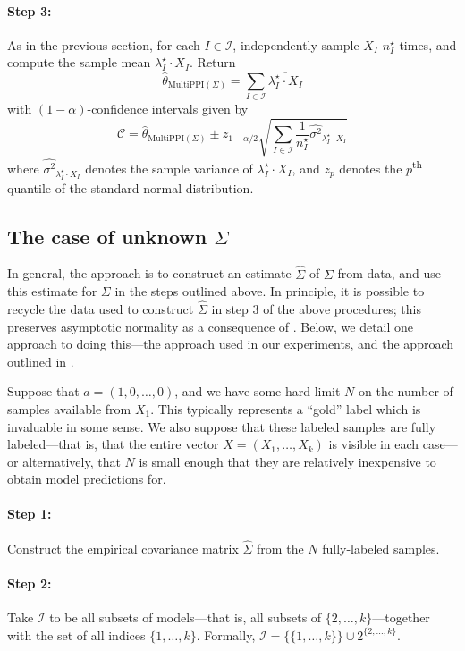 \documentclass{article} %
\newcommand{\wh}[1]{\widehat{#1}}
\begin{document}
\paragraph{Step 3:} 
As in the previous section, for each $I\in\mathcal{I}$, independently sample $X_I$ $n^\star_I$ times, and compute the sample mean $\overline{\lambda^\star_I\cdot X_I}$. Return
\[
\hat{\theta}_{\text{MultiPPI}(\Sigma)} = \sum_{I\in\mathcal{I}} \overline{\lambda_I^\star \cdot X_I}
\]
with $(1-\alpha)$-confidence intervals given by
\[
\mathcal{C} = \hat{\theta}_{\text{MultiPPI}(\Sigma)} \pm z_{1-\alpha/2} \sqrt{\sum_{I\in\mathcal{I}} \frac{1}{n^\star_I} \widehat{\sigma^2}_{\lambda_I^\star \cdot X_I}}
\]
where $\widehat{\sigma^2}_{\lambda_I^\star \cdot X_I}$ denotes the sample variance of $\lambda_I^\star \cdot X_I$, and $z_p$ denotes the $p$\textsuperscript{th} quantile of the standard normal distribution.

\subsection{The case of unknown $\Sigma$}\label{sec:algorithm_unknown}
In general, the approach is to construct an estimate $\widehat{\Sigma}$ of $\Sigma$ from data, and use this estimate for $\Sigma$ in the steps outlined above. In principle, it is possible to recycle the data used to construct $\wh{\Sigma}$ in step 3 of the above procedures; this preserves asymptotic normality as a consequence of . Below, we detail one approach to doing this---the approach used in our experiments, and the approach outlined in .

Suppose that $a=(1,0,\dots,0)$, and we have some hard limit $N$ on the number of samples available from $X_1$. This typically represents a ``gold'' label which is invaluable in some sense. We also suppose that these labeled samples are fully labeled---that is, that the entire vector $X=(X_1,\dots,X_k)$ is visible in each case---or alternatively, that $N$ is small enough that they are relatively inexpensive to obtain model predictions for. 

\paragraph{Step 1:} Construct the empirical covariance matrix $\wh{\Sigma}$ from the $N$ fully-labeled samples.

\paragraph{Step 2:} Take $\mathcal{I}$ to be all subsets of models---that is, all subsets of $\{2,\dots,k\}$---together with the set of all indices $\{1,\dots,k\}$. Formally, $\mathcal{I}=\{\{1,\dots,k\}\}\cup 2^{\{2,\dots,k\}}$.
\end{document}
